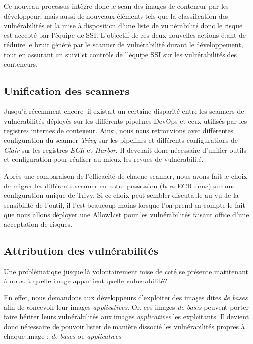 Ce nouveau processus intègre donc le scan des images de conteneur par les développeur, mais aussi de nouveaux éléments tels
que la classification des vulnérabilités et la mise à disposition d'une liste de vulnérabilité donc le risque est accepté
par l'équipe de \ac{SSI}.
\newline L'objectif de ces deux nouvelles actions étant de réduire le bruit généré par le scanner de vulnérabilité durant
le développement, tout en assurant un suivi et contrôle de l'équipe \ac{SSI} sur les vulnérabilités des conteneurs.

\newpage

\subsection{Unification des scanners}
Jusqu'à récemment encore, il existait un certaine disparité entre les scanners de vulnérabilités déployés sur les 
différents pipelines DevOps et ceux utilisés par les registres internes de conteneur. Ainsi, nous nous retrouvions avec 
différentes configuration du scanner \emph{Trivy} sur les pipelines et différents configurations de \emph{Clair} sur les
registres \emph{\ac{ECR}} et \emph{Harbor}. 
\newline Il devenait donc nécessaire d'unifier outils et configuration pour réaliser au mieux les revues de vulnérabilité.

Après une comparaison de l'efficacité de chaque scanner, nous avons fait le choix de migrer les différents scanner en 
notre possession (hors \ac{ECR} donc) sur une configuration unique de Trivy. Si ce choix peut sembler discutable au vu 
de la sensibilité de l'outil, il l'est beaucoup moins lorsque l'on prend en compte le fait que nous allons déployer une
AllowList pour les vulnérabilités faisant office d'une acceptation de risques.

\subsection{Attribution des vulnérabilités}
Une problématique jusque là volontairement mise de coté se présente maintenant à nous: à quelle image appartient quelle 
vulnérabilité?

En effet, nous demandons aux développeurs d'exploiter des images dites \emph{de bases} afin de concevoir leur 
images \emph{applicatives}. Or, ces images \emph{de bases} peuvent porter faire hériter leurs vulnérabilités aux images 
\emph{applicatives} les exploitants.
\newline Il devient donc nécessaire de pouvoir lister de manière dissocié les vulnérabilités propres à chaque image : 
\emph{de bases} ou \emph{applicatives}

